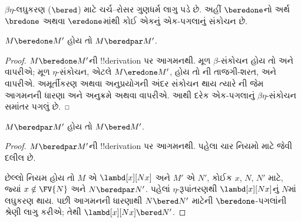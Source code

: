 \documentclass[../../../include/open-logic-section]{subfiles}
\begin{document}


$\beta\eta$-લઘુકરણ ($\bered$) માટે ચર્ચ--રોસર
ગુણધર્મ લાગુ પડે છે. અહીં $\beredone$નો અર્થ
$\bredone$ અથવા $\eredone$માંથી કોઈ એકનું
એક-પગલાનું સંકોચન છે.

\begin{lem}
  $M \beredone M'$ હોય તો $M \beredpar M'$.
\end{lem}

\begin{proof}
  $M \beredone M'$ની !!{derivation} પર આગમનથી.
  મૂળ $\beta$-સંકોચન હોય તો
   અને
   વાપરીએ; મૂળ
  $\eta$-સંકોચન, એટલે $M \eredone M'$, હોય તો
  ની તાજગી-શરત,
   અને
   વાપરીએ.
  અમૂર્તીકરણ અથવા અનુપ્રયોગની અંદર સંકોચન
  થાય ત્યારે ની જેમ
  આગમનની ધારણા અને અનુક્રમે
   અથવા
   વાપરીએ.
  આથી દરેક એક-પગલાનું $\beta\eta$-સંકોચન
  સમાંતર પગલું છે.
\end{proof}

\begin{lem}
  $M \beredpar M'$ હોય તો $M \bered M'$.
\end{lem}

\begin{proof}
  $M \beredpar M'$ની !!{derivation} પર આગમનથી.
  પહેલા ચાર નિયમો માટે
   જેવી દલીલ છે.

  છેલ્લો નિયમ  હોય તો
  $M$ એ $\lambd[x][Nx]$ અને $M'$ એ $N'$, કોઈક
  $x$, $N$, $N'$ માટે, જ્યાં
  $x \notin \FV{N}$ અને $N \beredpar N'$.
  પહેલાં $\eta$-રૂપાંતરણથી
  $\lambd[x][Nx]$નું $N$માં લઘુકરણ થાય.
  પછી આગમનની ધારણાથી $N \bered N'$ માટેની
  $\beredone$-પગલાંની શ્રેણી લાગુ કરીએ;
  તેથી $\lambd[x][Nx] \bered N'$.
\end{proof}
\end{document}
